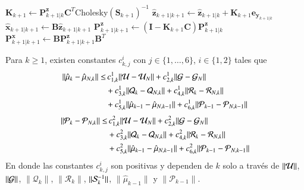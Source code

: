 \begin{algorithm}
\begin{algorithmic}[1]
    \State $\mathbf{K}_{k+1} \gets \mathbf{P}^{\mathbf{z}}_{k+1|k} \mathbf{C}^T$Cholesky$(\mathbf{S}_{k+1})^{-1}$
    \State $\hat{\mathbf{z}}_{k+1|k+1} \gets \hat{\mathbf{z}}_{k+1|k} + \mathbf{K}_{k+1} \mathbf{e}_{\mathbf{y}_{k+1|k}}$
    \State $\hat{\mathbf{x}}_{k+1|k+1} \gets \mathbf{B}\hat{\mathbf{z}}_{k+1|k+1}$
    \State $\mathbf{P}^\mathbf{z}_{k+1|k+1} \gets (\mathbf{I} - \mathbf{K}_{k+1} 
    \mathbf{C}) \mathbf{P}^{\mathbf{z}}_{k+1|k}$
    \State $\mathbf{P}^\mathbf{x}_{k+1|k+1} \gets \mathbf{B}\mathbf{P}^\mathbf{z}_{k+1|k+1} \mathbf{B}^T$
\EndFor
\end{algorithmic}
\end{algorithm}

\begin{prop}
	Para $k \geq 1$, existen constantes $c_{k,j}^i$ con $j \in \{ 1, \dots, 6\}$, $i \in \{ 1, 2\}$ tales que
	\begin{equation*}
		\begin{aligned}
			\| \hat \mu_{k} - \hat \mu_{N,k}  \| \leq & \, c_{1,k}^1 \| \U - \U_N \| +  c_{2,k}^1 \| \G - \G_N \| \\ 
			&+ c_{3,k}^1 \| \mathcal{Q}_{k} - \mathcal{Q}_{N, k} \| +c_{4,k}^1 \| \mathcal{R}_{k} - \mathcal{R}_{N, k} \| \\
			& + c_{5,k}^1 \| \hat \mu_{k-1} - \hat \mu_{N, k-1} \| + c_{6,k}^1 \| \mathcal{P}_{k-1} - \mathcal{P}_{N, k-1} \|
		\end{aligned}
		\label{}
	\end{equation*}
	\begin{equation*}
		\begin{aligned}
			\| \mathcal{P}_{k} - \mathcal{P}_{N,k} \| \leq & \, c_{1,k}^2 \| \U - \U_N \| +  c_{2,k}^2 \| \G - \G_N \| \\ 
			&+ c_{3,k}^2 \| \mathcal{Q}_{k} - \mathcal{Q}_{N, k} \| +c_{4,k}^2 \| \mathcal{R}_{k} - \mathcal{R}_{N, k} \| \\
			& + c_{5,k}^2 \| \hat \mu_{k-1} - \hat \mu_{N, k-1} \| + c_{6,k}^2 \| \mathcal{P}_{k-1} - \mathcal{P}_{N, k-1} \|
		\end{aligned}
	\end{equation*}
	En donde las constantes $c_{k,j}^i$ son positivas y dependen de $k$ solo a través de $\| \U \| $, $\| \G \| $, $\| \mathcal{Q}_{k} \| $, $\| \mathcal{R}_{k} \| $, $\| \S_{k}^{-1} \| $, $\| \hat{\mu}_{k-1} \| $ y $\| \mathcal{P}_{k-1} \| $.
	\label{prop:err_kkkf_1}
\end{prop}

